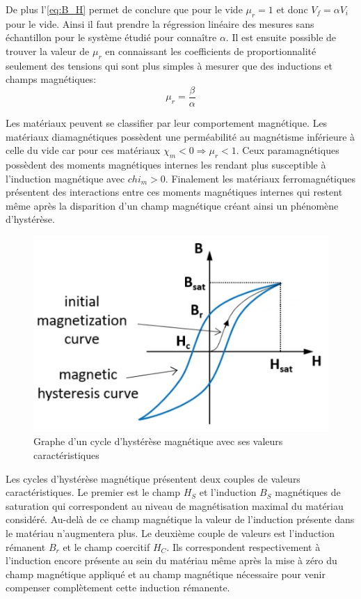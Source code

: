 De plus l'\autoref{eq:B_H} permet de conclure que pour le vide \(\mu_r = 1\) et donc \(V_f = \alpha V_i\) pour le vide. Ainsi il faut prendre la régression linéaire des mesures sans échantillon pour le système étudié pour connaître \(\alpha\). Il est ensuite possible de trouver la valeur de \(\mu_r\) en connaissant les coefficients de proportionnalité seulement des tensions qui sont plus simples à mesurer que des inductions et champs magnétiques:
\begin{equation} 
    \mu_r = \frac{\beta}{\alpha}
    \label{eq:mu_r}
\end{equation} 


Les matériaux peuvent se classifier par leur comportement magnétique. Les matériaux diamagnétiques possèdent une perméabilité au magnétisme inférieure à celle du vide car pour ces matériaux \(\chi_m < 0 \Rightarrow \mu_r < 1\). Ceux paramagnétiques possèdent des moments magnétiques internes les rendant plus susceptible à l'induction magnétique avec \(chi_m > 0\). Finalement les matériaux ferromagnétiques présentent des interactions entre ces moments magnétiques internes qui restent même après la disparition d'un champ magnétique créant ainsi un phénomène d'hystérèse.

\begin{figure}
    \centering
    \includegraphics[width=0.7\linewidth]{figures/cycle_hysterese.png}
    \caption{Graphe d'un cycle d'hystérèse magnétique avec ses valeurs caractéristiques \cite{graph_cycle}}
    \label{fig:cycle}
\end{figure}
Les cycles d'hystérèse magnétique présentent deux couples de valeurs caractéristiques. Le premier est le champ \(H_S\) et l'induction \(B_S\) magnétiques de saturation qui correspondent au niveau de magnétisation maximal du matériau considéré. Au-delà de ce champ magnétique la valeur de l'induction présente dans le matériau n'augmentera plus. Le deuxième couple de valeurs est l'induction rémanent \(B_r\) et le champ coercitif \(H_C\). Ils correspondent respectivement à l'induction encore présente au sein du matériau même après la mise à zéro du champ magnétique appliqué et au champ magnétique nécessaire pour venir compenser complètement cette induction rémanente.